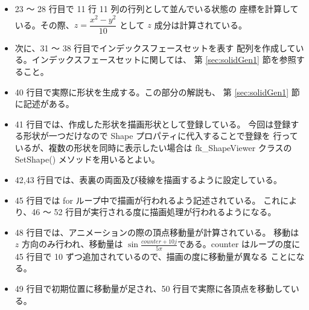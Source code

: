 \begin{itemize}
 \item 23 〜 28 行目で 11 行 11 列の行列として並んでいる状態の
	座標を計算している。その際、\(z = \dfrac{x^2 - y^2}{10}\)
	として \(z\) 成分は計算されている。

 \item 次に、31 〜 38 行目でインデックスフェースセットを表す
	配列を作成している。インデックスフェースセットに関しては、
	第 \ref{sec:solidGen1} 節を参照すること。

 \item 40 行目で実際に形状を生成する。この部分の解説も、
	第 \ref{sec:solidGen1} 節に記述がある。

 \item 41 行目では、作成した形状を描画形状として登録している。
	今回は登録する形状が一つだけなので Shape プロパティに代入することで登録を
	行っているが、複数の形状を同時に表示したい場合は fk\_ShapeViewer クラスの
	SetShape() メソッドを用いるとよい。

 \item 42,43 行目では、表裏の両面及び稜線を描画するように設定している。

 \item 45 行目では for ループ中で描画が行われるよう記述されている。
	これにより、46 〜 52 行目が実行される度に描画処理が行われるようになる。

 \item 48 行目では、アニメーションの際の頂点移動量が計算されている。
	移動は \(z\) 方向のみ行われ、移動量は
	\(\sin\frac{counter + 10j}{5\pi}\)である。counter はループの度に
	45 行目で 10 ずつ追加されているので、描画の度に移動量が異なる
	ことになる。

 \item 49 行目で初期位置に移動量が足され、50 行目で実際に各頂点を移動している。
\end{itemize}

